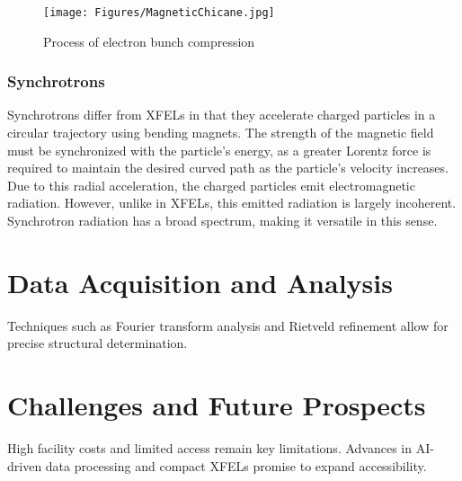 \documentclass[aps,prb,twocolumn,superscriptaddress]{revtex4-2}
\begin{document}
\begin{figure}[H]
    \centering
    \texttt{[image: Figures/MagneticChicane.jpg]}
    \caption{Process of electron bunch compression}
    \label{fig:Undulator}
\end{figure}

\subsubsection{Synchrotrons}
Synchrotrons differ from XFELs in that they accelerate charged particles in a
circular trajectory using bending magnets. The strength of the magnetic field
must be synchronized with the particle's energy, as a greater Lorentz force is
required to maintain the desired curved path as the particle's velocity
increases. Due to this radial acceleration, the charged particles emit
electromagnetic radiation. However, unlike in XFELs, this emitted radiation is
largely incoherent. Synchrotron radiation has a broad spectrum, making it 
versatile in this sense.






\section{Data Acquisition and Analysis} \label{sec:data}
Techniques such as Fourier transform analysis and Rietveld refinement allow for precise structural determination.

\section{Challenges and Future Prospects} \label{sec:challenges}
High facility costs and limited access remain key limitations. Advances in AI-driven data processing and compact XFELs
promise to expand accessibility.



\end{document}
